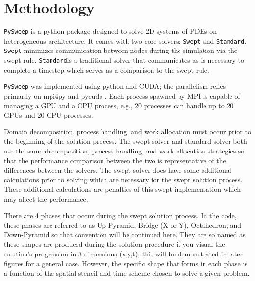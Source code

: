 \documentclass[review]{elsarticle}
\def\pysweep{\texttt{PySweep}}
\def\Swept{\texttt{Swept}}
\def\Standard{\texttt{Standard}}
\begin{document}
%
%

\section{Methodology}

\pysweep{} is a python package designed to solve 2D systems of PDEs on heterogeneous architecture. It comes with two core solvers: \Swept{} and \Standard{}. \Swept{} minimizes communication between nodes during the simulation via the swept rule. \Standard is a traditional solver that communicates as is necessary to complete a timestep which serves as a comparison to the swept rule.

\par
\pysweep{} was implemented using python and CUDA; the parallelism relies primarily on mpi4py and pycuda \cite{DalcinMPIPython, KlocknerPyCUDAGeneration}. Each process spawned by MPI is capable of managing a GPU and a CPU process, e.g., 20 processes can handle up to 20 GPUs and 20 CPU processes.    

\par Domain decomposition, process handling, and work allocation must occur prior to the beginning of the solution process. The swept solver and standard solver both use the same decomposition, process handling, and work allocation strategies so that the performance comparison between the two is representative of the differences between the solvers. The swept solver does have some additional calculations prior to solving which are necessary for the swept solution process. These additional calculations are penalties of this swept implementation which may affect the performance. 

\par
There are 4 phases that occur during the swept solution process. In the code, these phases are referred to as Up-Pyramid, Bridge (X or Y), Octahedron, and Down-Pyramid so that convention will be continued here. They are so named as these shapes are produced during the solution procedure if you visual the solution's progression in 3 dimensions (x,y,t); this will be demonstrated in later figures for a general case. However, the specific shape that forms in each phase is a function of the spatial stencil and time scheme chosen to solve a given problem.  
\end{document}
